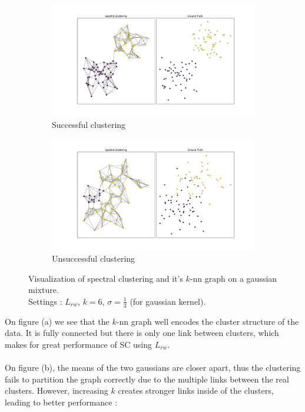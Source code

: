 \documentclass[a4paper,12pt]{article}
\theoremstyle{definition}
\theoremstyle{plain}
\begin{document}
\begin{figure}[H]
	\captionsetup{justification=centering}
	\begin{subfigure}{.6\textwidth}
		\centering
		\includegraphics[width=0.9\linewidth]{figures/fig5_g1}
		\caption{Successful clustering}
	\end{subfigure}
	\begin{subfigure}{.6\textwidth}
		\centering
		\includegraphics[width=0.9\linewidth]{figures/fig6_g2}
		\caption{Unsuccessful clustering}
	\end{subfigure}
	\caption{Visualization of spectral clustering and it's $k$-nn graph on a gaussian mixture. \\ Settings : $L_{rw}$, $k=6$, $\sigma=\frac{1}{3}$ (for gaussian kernel).}
\end{figure}
On figure (a) we see that the $k$-nn graph well encodes the cluster structure of the data. It is fully connected but there is only one link between clusters, which makes for great performance of SC using $L_{rw}$. \\ \\
On figure (b), the means of the two gaussians are closer apart, thus the clustering fails to partition the graph correctly due to the multiple links between the real clusters.
However, increasing $k$ creates stronger links inside of the clusters, leading to better performance : 
\end{document}
